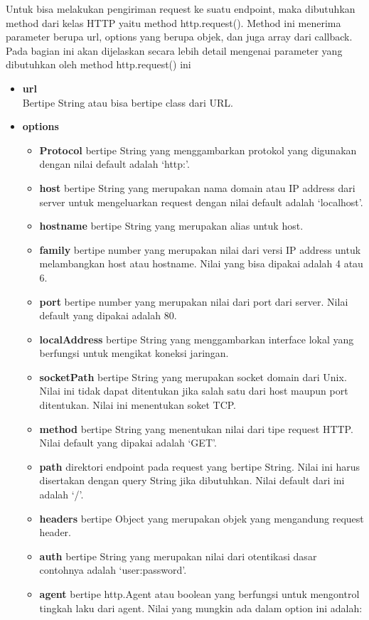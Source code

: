 Untuk bisa melakukan pengiriman request ke suatu endpoint, maka dibutuhkan method dari kelas HTTP yaitu method http.request(). Method ini menerima parameter berupa url, options yang berupa objek, dan juga array dari callback. Pada bagian ini akan dijelaskan secara lebih detail mengenai parameter yang dibutuhkan oleh method http.request() ini
\begin{itemize}
	\item \textbf{url}\\
	Bertipe String atau bisa bertipe class dari URL. 
	\item \textbf{options}
	\begin{itemize}
		\item \textbf{Protocol} bertipe String yang menggambarkan protokol yang digunakan dengan nilai default adalah `http:'. 
		\item \textbf{host} bertipe String yang merupakan nama domain atau IP address dari server untuk mengeluarkan request dengan nilai default adalah `localhost'. 
		\item \textbf{hostname} bertipe String yang merupakan alias untuk host.
		\item \textbf{family} bertipe number yang merupakan nilai dari versi IP address untuk melambangkan host atau hostname. Nilai yang bisa dipakai adalah 4 atau 6. 
		\item \textbf{port} bertipe number yang merupakan nilai dari port dari server. Nilai default yang dipakai adalah 80. 
		\item \textbf{localAddress} bertipe String yang menggambarkan interface lokal yang berfungsi untuk mengikat koneksi jaringan. 
		\item \textbf{socketPath} bertipe String yang merupakan socket domain dari Unix. Nilai ini tidak dapat ditentukan jika salah satu dari host maupun port ditentukan. Nilai ini menentukan soket TCP. 
		\item \textbf{method} bertipe String yang menentukan nilai dari tipe request HTTP. Nilai default yang dipakai adalah `GET'. 
		\item \textbf{path} direktori endpoint pada request yang bertipe String. Nilai ini harus disertakan dengan query String jika dibutuhkan. Nilai default dari ini adalah `/'. 
		\item \textbf{headers} bertipe Object yang merupakan objek yang mengandung request header. 
		\item \textbf{auth} bertipe String yang merupakan nilai dari otentikasi dasar contohnya adalah `user:password'. 
		\item \textbf{agent} bertipe http.Agent atau boolean yang berfungsi untuk mengontrol tingkah laku dari agent. Nilai yang mungkin ada dalam option ini adalah:

\end{itemize}
\end{itemize}
